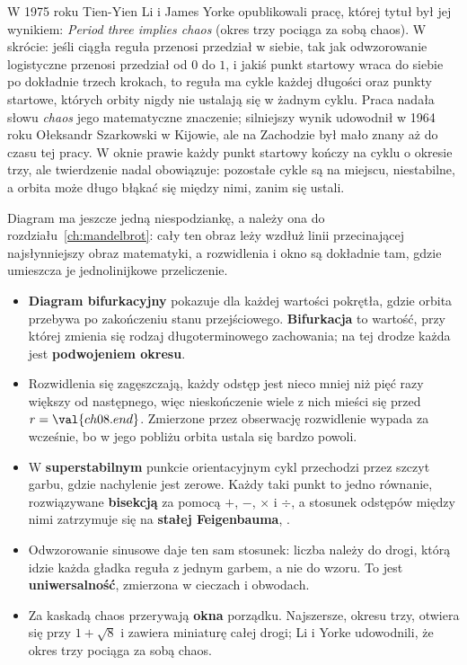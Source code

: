 \begin{note}
W 1975 roku Tien-Yien Li i James Yorke opublikowali pracę, której tytuł był
jej wynikiem: \emph{Period three implies chaos} (okres trzy pociąga za sobą
chaos). W skrócie: jeśli ciągła reguła przenosi przedział w siebie, tak jak
odwzorowanie logistyczne przenosi przedział od $0$ do $1$, i jakiś punkt
startowy wraca do siebie po dokładnie trzech krokach, to reguła ma cykle
każdej długości oraz punkty startowe, których orbity nigdy nie ustalają się
w żadnym cyklu. Praca nadała słowu \emph{chaos} jego matematyczne znaczenie;
silniejszy wynik udowodnił w 1964 roku Ołeksandr Szarkowski w Kijowie, ale
na Zachodzie był mało znany aż do czasu tej pracy. W oknie prawie każdy
punkt startowy kończy na cyklu o okresie trzy, ale twierdzenie nadal
obowiązuje: pozostałe cykle są na miejscu, niestabilne, a orbita może długo
błąkać się między nimi, zanim się ustali.
\end{note}

\noindent
Diagram ma jeszcze jedną niespodziankę, a należy ona do
rozdziału~\ref{ch:mandelbrot}: cały ten obraz leży wzdłuż linii
przecinającej najsłynniejszy obraz matematyki, a rozwidlenia i okno są
dokładnie tam, gdzie umieszcza je jednolinijkowe przeliczenie.

\begin{summarybox}
\begin{itemize}
\item \textbf{Diagram bifurkacyjny} pokazuje dla każdej wartości pokrętła,
  gdzie orbita przebywa po zakończeniu stanu przejściowego.
  \textbf{Bifurkacja} to wartość, przy której zmienia się rodzaj
  długoterminowego zachowania; na tej drodze każda jest \textbf{podwojeniem
  okresu}.
\item Rozwidlenia się zagęszczają, każdy odstęp jest nieco mniej niż pięć
  razy większy od następnego, więc nieskończenie wiele z nich mieści się
  przed $r = \val{ch08.end}$. Zmierzone przez obserwację rozwidlenie wypada
  za wcześnie, bo w jego pobliżu orbita ustala się bardzo powoli.
\item W \textbf{superstabilnym} punkcie orientacyjnym cykl przechodzi przez
  szczyt garbu, gdzie nachylenie jest zerowe. Każdy taki punkt to jedno
  równanie, rozwiązywane \textbf{bisekcją} za pomocą $+$, $-$, $\times$ i
  $\div$, a stosunek odstępów między nimi zatrzymuje się na \textbf{stałej
  Feigenbauma}, .
\item Odwzorowanie sinusowe daje ten sam stosunek: liczba należy do drogi,
  którą idzie każda gładka reguła z jednym garbem, a nie do wzoru. To jest
  \textbf{uniwersalność}, zmierzona w cieczach i obwodach.
\item Za kaskadą chaos przerywają \textbf{okna} porządku. Najszersze, okresu
  trzy, otwiera się przy $1 + \sqrt{8}$ i zawiera miniaturę całej drogi; Li
  i Yorke udowodnili, że okres trzy pociąga za sobą chaos.
\end{itemize}
\end{summarybox}

